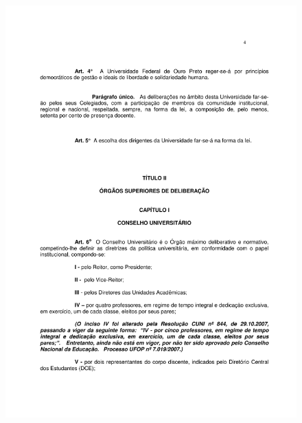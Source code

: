 \begin{figure}[p]
	\centering 
	\includegraphics[scale=0.7]{capitulos/resolucoes/cuni414/cuni414-4.pdf}
\end{figure} \pagebreak

